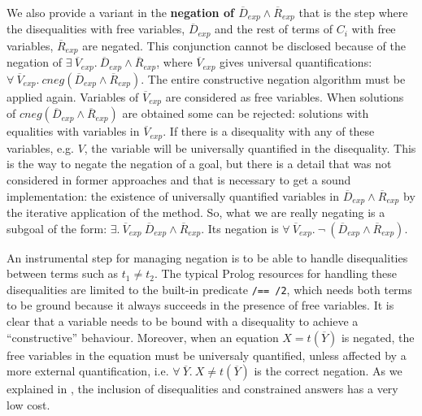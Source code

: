 \documentclass{llncs}
\begin{document}
We also provide a variant in the {\bf negation of $\overline{D}_{exp}
           \wedge \overline{R}_{exp}$} that is the step where the
           disequalities with free variables, $\overline{D}_{exp}$ and
           the rest of terms of $C_i$ with free variables,
           $\overline{R}_{exp}$ are negated. This conjunction cannot
           be disclosed because of the negation of $ \exists~
           \overline{V}_{exp}.~ \overline{D}_{exp} \wedge
           \overline{R}_{exp}$, where $\overline{V}_{exp}$ gives
           universal quantifications: $\forall~ \overline{V}_{exp}.~
           cneg(\overline{D}_{exp} \wedge \overline{R}_{exp})$. The
           entire constructive negation algorithm must be applied
           again. Variables of $\overline{V}_{exp}$ are considered as
           free variables. When solutions of $cneg(\overline{D}_{exp}
           \wedge \overline{R}_{exp})$ are obtained some can be
           rejected: solutions with equalities with variables in
           $\overline{V}_{exp}$. If there is a disequality with any of
           these variables, e.g. $V$, the variable will be universally
           quantified in the disequality.  This is the way to negate
           the negation of a goal, but there is a detail that was not
           considered in former approaches and that is necessary to
           get a sound implementation: the existence of universally
           quantified variables in $\overline{D}_{exp} \wedge
           \overline{R}_{exp}$ by the iterative application of the
           method.  So, what we are really negating is a subgoal of
           the form: $ \exists.~ \overline{V}_{exp}~
           \overline{D}_{exp} \wedge \overline{R}_{exp}$. Its negation
           is $\forall ~ \overline{V}_{exp}.~ \neg~(\overline{D}_{exp}
           \wedge \overline{R}_{exp})$.

An instrumental step for managing negation is to be able to handle
disequalities between terms such as $t_1 \neq t_2$.  The typical
Prolog resources for handling these disequalities are limited to the
built-in predicate {\tt /== /2}, which needs both terms to be ground
because it always succeeds in the presence of free variables.  It is
clear that a variable needs to be bound with a disequality to achieve
a ``constructive'' behaviour.  Moreover, when an equation $X =
t(\overline{Y})$ is negated, the free variables in the equation must
be universaly quantified, unless affected by a more external
quantification, i.e. $\forall~ \overline{Y}.~X \neq t(\overline{Y})$ is
the correct negation.  As we explained in \cite{SusanaPADL2000}, the
inclusion of disequalities and constrained answers has a very low
cost.
\end{document}
